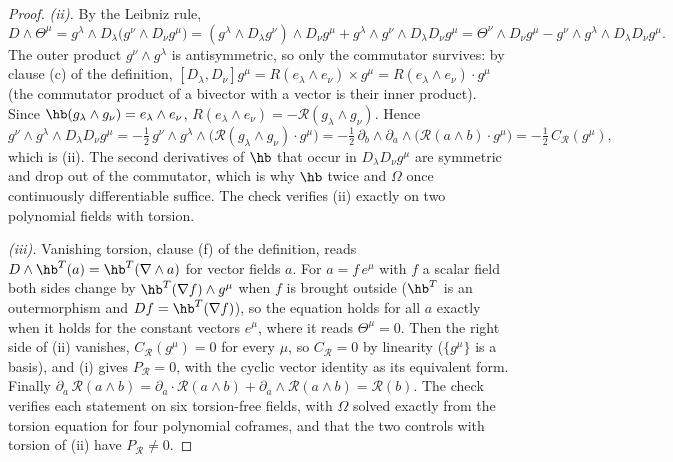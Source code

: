 \begin{proof}
\emph{(ii).} By the Leibniz rule,
\[
D\wedge\Theta^{\mu} = g^{\lambda}\wedge D_{\lambda}\bigl(g^{\nu}\wedge D_{\nu}g^{\mu}\bigr) = (g^{\lambda}\wedge D_{\lambda}g^{\nu})\wedge D_{\nu}g^{\mu} + g^{\lambda}\wedge g^{\nu}\wedge D_{\lambda}D_{\nu}g^{\mu} = \Theta^{\nu}\wedge D_{\nu}g^{\mu} - g^{\nu}\wedge g^{\lambda}\wedge D_{\lambda}D_{\nu}g^{\mu} .
\]
The outer product $g^{\nu}\wedge g^{\lambda}$ is antisymmetric, so only the commutator survives: by clause (c) of the definition, $[D_{\lambda}, D_{\nu}]g^{\mu} = R(e_{\lambda}\wedge e_{\nu})\times g^{\mu} = R(e_{\lambda}\wedge e_{\nu})\cdot g^{\mu}$ (the commutator product of a bivector with a vector is their inner product). Since $\hb(g_{\lambda}\wedge g_{\nu}) = e_{\lambda}\wedge e_{\nu}$, $R(e_{\lambda}\wedge e_{\nu}) = -\mathcal{R}(g_{\lambda}\wedge g_{\nu})$. Hence
\[
g^{\nu}\wedge g^{\lambda}\wedge D_{\lambda}D_{\nu}g^{\mu} = -\tfrac12\,g^{\nu}\wedge g^{\lambda}\wedge\bigl(\mathcal{R}(g_{\lambda}\wedge g_{\nu})\cdot g^{\mu}\bigr) = -\tfrac12\,\partial_{b}\wedge\partial_{a}\wedge\bigl(\mathcal{R}(a\wedge b)\cdot g^{\mu}\bigr) = -\tfrac12\,C_{\mathcal{R}}(g^{\mu}),
\]
which is (ii). The second derivatives of $\hb$ that occur in $D_{\lambda}D_{\nu}g^{\mu}$ are symmetric and drop out of the commutator, which is why $\hb$ twice and $\Omega$ once continuously differentiable suffice. The check verifies (ii) exactly on two polynomial fields with torsion.

\emph{(iii).} Vanishing torsion, clause (f) of the definition, reads $D\wedge\hb^{T}(a) = \hb^{T}(\nabla\wedge a)$ for vector fields $a$. For $a = f\,e^{\mu}$ with $f$ a scalar field both sides change by $\hb^{T}(\nabla f)\wedge g^{\mu}$ when $f$ is brought outside ($\hb^{T}$ is an outermorphism and $D f = \hb^{T}(\nabla f)$), so the equation holds for all $a$ exactly when it holds for the constant vectors $e^{\mu}$, where it reads $\Theta^{\mu} = 0$. Then the right side of (ii) vanishes, $C_{\mathcal{R}}(g^{\mu}) = 0$ for every $\mu$, so $C_{\mathcal{R}} = 0$ by linearity ($\{g^{\mu}\}$ is a basis), and (i) gives $P_{\mathcal{R}} = 0$, with the cyclic vector identity as its equivalent form. Finally $\partial_{a}\,\mathcal{R}(a\wedge b) = \partial_{a}\cdot\mathcal{R}(a\wedge b) + \partial_{a}\wedge\mathcal{R}(a\wedge b) = \mathcal{R}(b)$. The check verifies each statement on six torsion-free fields, with $\Omega$ solved exactly from the torsion equation for four polynomial coframes, and that the two controls with torsion of (ii) have $P_{\mathcal{R}} \neq 0$.


\end{proof}

